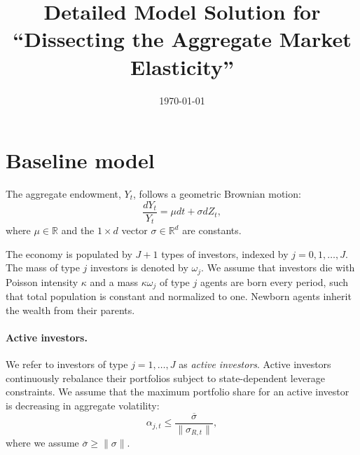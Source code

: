 \documentclass[12pt,english]{article}
\title{\textbf{Detailed Model Solution for\\ ``Dissecting the Aggregate Market Elasticity''}}
\begin{document}
\author{}
\date{\today}
\maketitle
\doublespacing
\section{Baseline model}
The aggregate endowment, $Y_t$, follows a geometric Brownian motion:
\begin{equation}\label{eq:agg_endow}
	\frac{d Y_t}{Y_t} = \mu dt + \sigma dZ_t,
\end{equation}
where $\mu\in\mathbb{R}$ and the $1\times d$ vector $\sigma\in\mathbb{R}^d$ are constants.

The economy is populated by $J+1$ types of investors, indexed by $j = 0, 1, \ldots, J$. The mass of type $j$ investors is denoted by $\omega_j$. We assume that investors die with Poisson intensity $\kappa$ and a mass $\kappa \omega_j$ of type $j$ agents are born every period, such that total population is constant and normalized to one. 
Newborn agents inherit the wealth from their parents.

\paragraph{Active investors.} We refer to investors of type $j = 1,\ldots, J$ as \textit{active investors}. Active investors continuously rebalance their portfolios subject to state-dependent leverage constraints. 
We assume that the maximum portfolio share for an active investor is decreasing in aggregate volatility:
\begin{equation}\label{eq:leverage_constraint}
	\alpha_{j,t} \leq \frac{\overline{\sigma}}{\|\sigma_{R,t}\|},
\end{equation}
where we assume $\overline{\sigma} \geq \|\sigma\|$.
\end{document}
